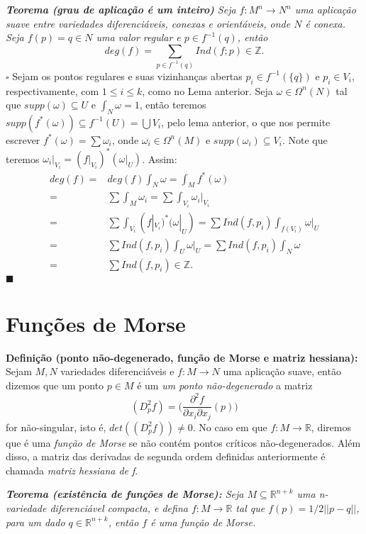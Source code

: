\documentclass{article}
\begin{document}
	\vspace{2mm}
	\textit{\textbf{Teorema (grau de aplicação é um inteiro)} Seja $f : M^{n} \to N^{n}$ uma aplicação suave entre variedades diferenciáveis, conexas e orientáveis, onde $N$ é conexa. Seja $f(p) = q \in N$ uma valor regular e $p \in f^{-1}(q)$, então}
	$$
	deg(f) = \sum \limits_{p \in f^{-1}(q)} Ind(f;p) \in \mathbb{Z}.
	$$
	$\square$ Sejam os pontos regulares e suas vizinhanças abertas $p_{i} \in f^{-1}(\{q\})$ e $p_{i} \in V_{i}$, respectivamente, com $1\leq i \leq k$, como no Lema anterior. Seja $\omega \in \Omega^{n}(N)$ tal que $supp(\omega) \subseteq U$ e $\int_{N} \omega = 1$, então teremos $supp(f^{*}(\omega)) \subseteq f^{-1}(U) = \bigcup V_{i}$, pelo lema anterior, o que nos permite escrever $f^{*}(\omega) = \sum \omega_{i}$, onde $\omega_{i} \in \Omega^{n}(M)$ e $supp(\omega_{i}) \subseteq V_{i}$. Note que teremos $\omega_{i}|_{V_{i}}  = (f|_{V_{i}})^{*}(\omega|_{U})$. Assim:
	$$
	\begin{aligned}
	deg(f) =& deg(f)\int_{N} \omega = \int_{M} f^{*}(\omega)
	\\
	=& \sum \int_{M}\omega_{i} = \sum \int_{V_{i}}\omega_{i}|_{V_{i}}
	\\
	=& \sum \int_{V_{i}} (f|_{V_{i}})^{*}(\omega|_{U}) = \sum Ind(f, p_{i}) \int_{f(V_{i})} \omega|_{U}
	\\
	=& \sum Ind(f, p_{i}) \int_{U} \omega|_{U} = \sum Ind(f, p_{i}) \int_{N} \omega
	\\
	=& \sum Ind(f, p_{i}) \in \mathbb{Z}.
	\end{aligned}$$
	$\blacksquare$
	
	\section{Funções de Morse}
	
	\textbf{Definição (ponto não-degenerado, função de Morse e matriz hessiana):} Sejam $M, N$ variedades diferenciáveis e $f: M \to N$ uma aplicação suave, então dizemos que um ponto $p \in M$ é um \textit{um ponto não-degenerado} a matriz $$
	(D_{p}^{2}f) = \Big( \frac{\partial^{2}f}{\partial x_{i} \partial x_{j}} (p) \Big)
	$$
	for não-singular, isto é, $det(	(D_{p}^{2}f)) \neq 0$. No caso em que $f: M \to \mathbb{R}$, diremos que é uma \textit{função de Morse} se não contém pontos críticos não-degenerados. Além disso, a matriz das derivadas de segunda ordem definidas anteriormente é chamada \textit{matriz hessiana de f}.
	
	\vspace{2mm}
	\textit{\textbf{Teorema (existência de funções de Morse):} Seja $M \subseteq \mathbb{R}^{n+k}$ uma n-variedade diferenciável compacta, e defina $f:M \to \mathbb{R}$ tal que $f(p) = 1/2||p-q||$, para um dado $q \in \mathbb{R}^{n+k}$, então $f$ é uma função de Morse.}
	
\end{document}
